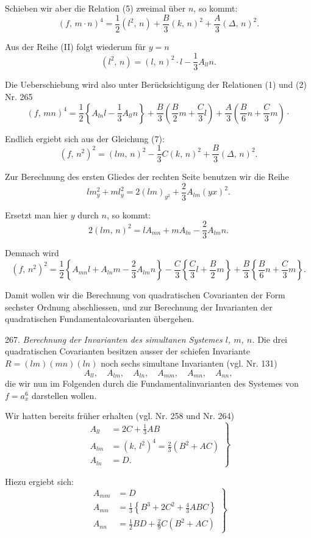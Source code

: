 \documentclass[11pt]{article}
\providecommand{\weberpage}[1]{}
\providecommand{\weq}[2]{\begin{equation}\tag{#1}#2\end{equation}}
\let\Delta\varDelta
\begin{document}
Schieben wir aber die Relation (5) zweimal über $n$, so kommt:
\[
(f,\,m\cdot n)^4=\frac{1}{2}(l^2,\,n)+\frac{B}{3}(k,\,n)^2+\frac{A}{3}(\Delta,\,n)^2.
\]

Aus der Reihe (II) folgt wiederum für $y=n$
\[
(l^2,\,n)=(l,\,n)^2\cdot l - \frac{1}{3}A_{ll}n.
\]

Die Ueberschiebung wird also unter Berücksichtigung der Relationen (1) und (2) Nr. 265
\[
(f,\,mn)^4=\frac{1}{2}\left\{A_{ln}l-\frac{1}{3}A_{ll}n\right\}+\frac{B}{3}\left(\frac{B}{2}m+\frac{C}{3}l\right)+\frac{A}{3}\left(\frac{B}{6}n+\frac{C}{3}m\right)\cdot
\]

Endlich ergiebt sich aus der Gleichung (7):
\[
(f,\,n^2)^2=(lm,\,n)^2-\frac{1}{3}C(k,\,n)^2+\frac{B}{3}(\Delta,\,n)^2.
\]


\weberpage{290}

Zur Berechnung des ersten Gliedes der rechten Seite benutzen wir die Reihe
\[
lm_y^2+ml_y^2=2(lm)_{y^2}+\frac{2}{3}A_{lm}(yx)^2.
\]

Ersetzt man hier $y$ durch $n$, so kommt:
\[
2(lm,\,n)^2=lA_{mn}+mA_{ln}-\frac{2}{3}A_{lm}n.
\]

Demnach wird
\[
(f,\,n^2)^2=\frac{1}{2}\left\{A_{mn}l+A_{ln}m-\frac{2}{3}A_{lm}n\right\}-\frac{C}{3}\left\{\frac{C}{3}l+\frac{B}{2}m\right\}+\frac{B}{3}\left\{\frac{B}{6}n+\frac{C}{3}m\right\}.
\]

Damit wollen wir die Berechnung von quadratischen Covarianten der Form sechster Ordnung abschliessen, und zur Berechnung der Invarianten der quadratischen Fundamentalcovarianten übergehen.

267. \textit{Berechnung der Invarianten des simultanen Systemes $l$, $m$, $n$.} Die drei quadratischen Covarianten besitzen ausser der schiefen Invariante $R=(lm)(mn)(ln)$ noch sechs simultane Invarianten (vgl. Nr. 131)
\[
A_{ll},\quad A_{lm},\quad A_{ln},\quad A_{mm},\quad A_{mn},\quad A_{nn},
\]
die wir nun im Folgenden durch die Fundamentalinvarianten des Systemes von $f=a_x^6$ darstellen wollen.

Wir hatten bereits früher erhalten (vgl. Nr. 258 und Nr. 264)
\weq{1}{\left.\begin{aligned} A_{ll}&=2C+\frac{1}{3}AB\\ A_{lm}&=(k,\,l^2)^4=\frac{2}{3}(B^2+AC)\\ A_{ln}&=D. \end{aligned}\right\}}

Hiezu ergiebt sich:
\weq{2}{\left.\begin{aligned} A_{mm}&=D\\ A_{mn}&=\frac{1}{3}\left\{B^3+2C^2+\frac{4}{3}ABC\right\}\\ A_{nn}&=\frac{1}{2}BD+\frac{2}{9}C(B^2+AC) \end{aligned}\right\}}
\end{document}
